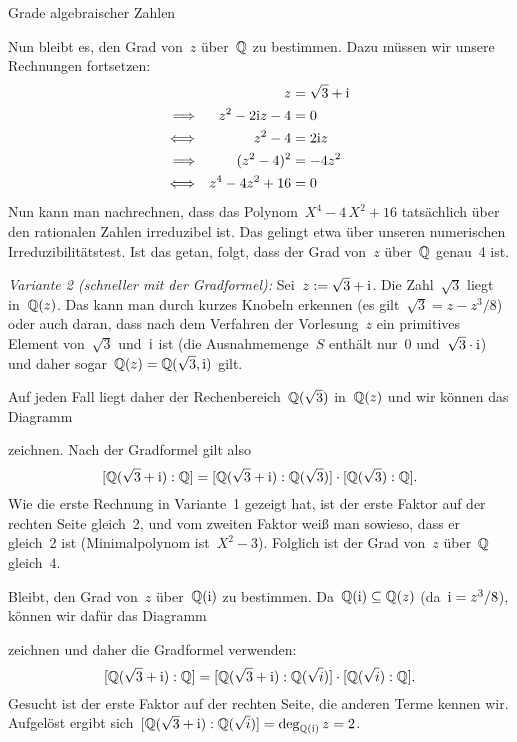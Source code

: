 \documentclass{algblatt}
\begin{document}
\begin{aufgabe}{Grade algebraischer Zahlen}
\begin{loesungE}
Nun bleibt es, den Grad von~$z$ über~$\mathbb{Q}$ zu bestimmen. Dazu müssen wir unsere
Rechnungen fortsetzen:
\begin{align*}
  && z &= \sqrt{3} + \mathrm{i} \\
  \Longrightarrow&& z^2 - 2\mathrm{i} z - 4 &= 0 \\
  \Longleftrightarrow&& z^2 - 4 &= 2 \mathrm{i} z \\
  \Longrightarrow&& (z^2 - 4)^2 &= -4z^2 \\
  \Longleftrightarrow&& z^4 - 4z^2 + 16 &= 0
\end{align*}
Nun kann man nachrechnen, dass das Polynom~$X^4 - 4\,X^2 + 16$ tatsächlich über
den rationalen Zahlen irreduzibel ist. Das gelingt etwa über unseren
numerischen Irreduzibilitätstest. Ist das getan, folgt, dass der Grad von~$z$
über~$\mathbb{Q}$ genau~4 ist.

\emph{Variante 2 (schneller mit der Gradformel):} Sei~$z := \sqrt{3} + \mathrm{i}$. Die
Zahl~$\sqrt{3}$ liegt in~$\mathbb{Q}(z)$. Das kann man durch kurzes Knobeln erkennen
(es gilt~$\sqrt{3} = z - z^3/8$) oder auch daran, dass nach dem Verfahren der
Vorlesung~$z$ ein primitives Element von~$\sqrt{3}$ und~$\mathrm{i}$ ist (die
Ausnahmemenge~$S$ enthält nur~$0$ und~$\sqrt{3} \cdot \mathrm{i}$) und daher
sogar~$\mathbb{Q}(z) = \mathbb{Q}(\sqrt{3}, \mathrm{i})$ gilt.

Auf jeden Fall liegt daher der Rechenbereich~$\mathbb{Q}(\sqrt{3})$ in~$\mathbb{Q}(z)$ und
wir können das Diagramm
\begin{center}\end{center}
zeichnen. Nach der Gradformel gilt also
\[ [\mathbb{Q}(\sqrt{3}+\mathrm{i}):\mathbb{Q}] = [\mathbb{Q}(\sqrt{3}+\mathrm{i}):\mathbb{Q}(\sqrt{3})] \cdot
  [\mathbb{Q}(\sqrt{3}):\mathbb{Q}]. \]
Wie die erste Rechnung in Variante~1 gezeigt hat, ist der erste Faktor auf der
rechten Seite gleich~2, und vom zweiten Faktor weiß man sowieso, dass er
gleich~2 ist (Minimalpolynom ist~$X^2 - 3$). Folglich ist der Grad von~$z$
über~$\mathbb{Q}$ gleich~$4$.

Bleibt, den Grad von~$z$ über~$\mathbb{Q}(\mathrm{i})$ zu bestimmen. Da~$\mathbb{Q}(\mathrm{i}) \subseteq
\mathbb{Q}(z)$ (da~$\mathrm{i} = z^3/8$), können wir dafür das Diagramm
\begin{center}\end{center}
zeichnen und daher die Gradformel verwenden:
\[ [\mathbb{Q}(\sqrt{3}+\mathrm{i}):\mathbb{Q}] = [\mathbb{Q}(\sqrt{3}+\mathrm{i}):\mathbb{Q}(\sqrt{i})] \cdot
  [\mathbb{Q}(\sqrt{i}):\mathbb{Q}]. \]
Gesucht ist der erste Faktor auf der rechten Seite, die anderen Terme kennen
wir. Aufgelöst ergibt sich~$[\mathbb{Q}(\sqrt{3}+\mathrm{i}):\mathbb{Q}(\sqrt{i})] =
\deg_{\mathbb{Q}(\mathrm{i})} z = 2$.


\end{loesungE}
\end{aufgabe}
\end{document}
